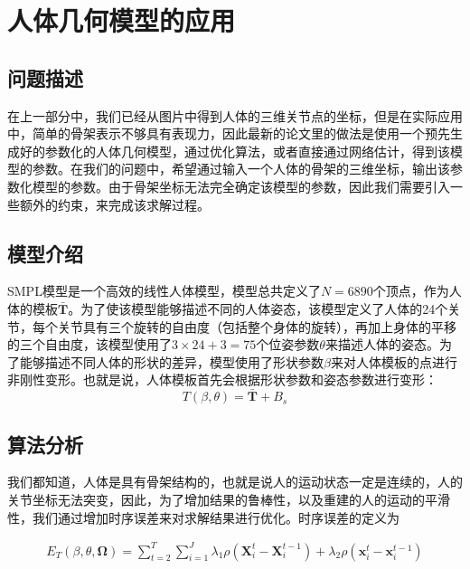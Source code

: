 \section{人体几何模型的应用}
\subsection{问题描述}
在上一部分中，我们已经从图片中得到人体的三维关节点的坐标，但是在实际应用中，简单的骨架表示不够具有表现力，因此最新的论文里的做法是使用一个预先生成好的参数化的人体几何模型，通过优化算法，或者直接通过网络估计，得到该模型的参数。在我们的问题中，希望通过输入一个人体的骨架的三维坐标，输出该参数化模型的参数。由于骨架坐标无法完全确定该模型的参数，因此我们需要引入一些额外的约束，来完成该求解过程。

\subsection{模型介绍}
SMPL模型是一个高效的线性人体模型，模型总共定义了\(N = 6890\)个顶点，作为人体的模板\(\bar{\bm{T}}\)。为了使该模型能够描述不同的人体姿态，该模型定义了人体的24个关节，每个关节具有三个旋转的自由度（包括整个身体的旋转），再加上身体的平移的三个自由度，该模型使用了\(3\times 24 + 3 = 75\)个位姿参数\(\theta\)来描述人体的姿态。为了能够描述不同人体的形状的差异，模型使用了形状参数\(\beta\)来对人体模板的点进行非刚性变形。也就是说，人体模板首先会根据形状参数和姿态参数进行变形：
\begin{equation}
    T(\beta, \theta) = \bar{\bm{T}} + B_s
\end{equation}

\subsection{算法分析}

我们都知道，人体是具有骨架结构的，也就是说人的运动状态一定是连续的，人的关节坐标无法突变，因此，为了增加结果的鲁棒性，以及重建的人的运动的平滑性，我们通过增加时序误差来对求解结果进行优化。时序误差的定义为

\begin{align} 
    E _ { T } ( \beta , \theta , \mathbf { \Omega } ) = \sum _ { t = 2 } ^ { T } \sum _ { i = 1 } ^ { J } \lambda _ { 1 } \rho \left( \mathbf { X } _ { i } ^ { t } - \mathbf { X } _ { i } ^ { t - 1 } \right) + \lambda _ { 2 } \rho \left( \mathbf { x } _ { i } ^ { t } - \mathbf { x } _ { i } ^ { t - 1 } \right)
\end{align}

